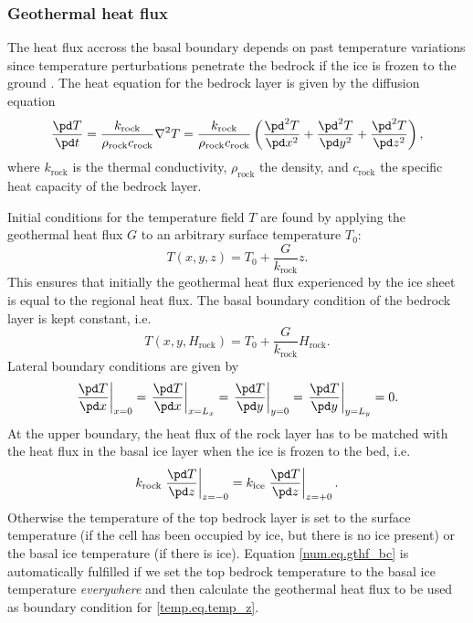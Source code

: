 \subsubsection{Geothermal heat flux}
The heat flux accross the basal boundary depends on past temperature variations since temperature perturbations penetrate the bedrock if the ice is frozen to the ground \citep{Ritz1987}. 
The heat equation for the bedrock layer is given by the diffusion equation
\begin{equation}
  \label{num.eq.diffu_rock}
  \frac{\pd T}{\pd t} = \frac{k_{\text{rock}}}{\rho_{\text{rock}}c_{\text{rock}}}\nabla^2T=\frac{k_{\text{rock}}}{\rho_{\text{rock}}c_{\text{rock}}} 
  \left(\frac{\pd^2 T}{\pd x^2}+\frac{\pd^2 T}{\pd y^2}+\frac{\pd^2 T}{\pd z^2}\right),
\end{equation}
where $k_{\text{rock}}$ is the thermal conductivity, $\rho_{\text{rock}}$ the density, and $c_{\text{rock}}$ the specific heat capacity of the bedrock layer. 

Initial conditions for the temperature field $T$ are found by applying the geothermal heat flux $G$ to an arbitrary surface temperature $T_0$:
\begin{equation}
  T(x,y,z)=T_0+\frac{G}{k_{\text{rock}}}z.
\end{equation}
This ensures that initially the geothermal heat flux experienced by the ice sheet is equal to the regional heat flux. The basal boundary condition of the bedrock layer is kept constant, i.e.
\begin{equation}
  T(x,y,H_{\text{rock}})=T_0+\frac{G}{k_{\text{rock}}}H_{\text{rock}}.
\end{equation}
Lateral boundary conditions are given by
\begin{equation}
  \left.\frac{\pd T}{\pd x}\right|_{x=0} = \left.\frac{\pd T}{\pd x}\right|_{x=L_x} = \left.\frac{\pd T}{\pd y}\right|_{y=0} = \left.\frac{\pd T}{\pd y}\right|_{y=L_y} = 0.
\end{equation}
At the upper boundary, the heat flux of the rock layer has to be matched with the heat flux in the basal ice layer when the ice is frozen to the bed, i.e.
\begin{equation}
  \label{num.eq.gthf_bc}
  k_{\text{rock}}\left.\frac{\pd T}{\pd z}\right|_{z=-0}=k_{\text{ice}}\left.\frac{\pd T}{\pd z}\right|_{z=+0}.
\end{equation}
Otherwise the temperature of the top bedrock layer is set to the surface temperature (if the cell has been occupied by ice, but there is no ice present) or the basal ice temperature (if there is ice). Equation \eqref{num.eq.gthf_bc} is automatically fulfilled if we set the top bedrock temperature to the basal ice temperature \emph{everywhere} and then calculate the geothermal heat flux to be used as boundary condition for \eqref{temp.eq.temp_z}.



